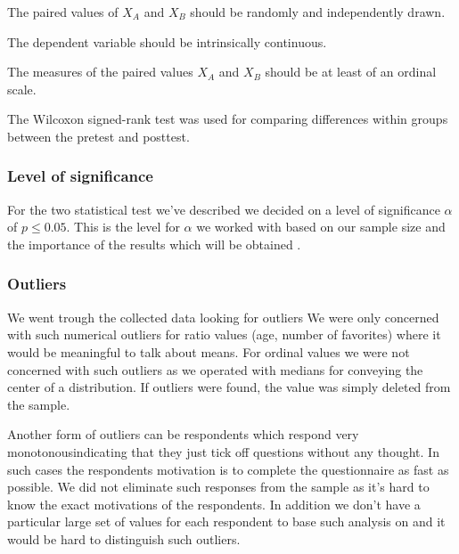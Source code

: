 \begin{enum}
  \item The paired values of $X_A$ and $X_B$
    should be randomly and independently drawn.
  \item The dependent variable should be intrinsically continuous.
  \item The measures of the paired values $X_A$ and $X_B$
    should be at least of an ordinal scale.
\end{enum}

The Wilcoxon signed-rank test was used for comparing differences within
groups between the pretest and posttest.

\subsubsection{Level of significance}
\label{section:empirical.method.data.analysis.level.of.significance}

For the two statistical test we've described we decided on a level
of significance $\alpha$ of $p \leq 0.05$.
This is the level for $\alpha$ we worked with based on
our sample size and the importance of the results which will be obtained
\citep[]{siegel88}.

\subsubsection{Outliers}

We went trough the collected data looking for outliers
\dash{}
We were only concerned with such numerical outliers for ratio values
(age, number of favorites) where it would be meaningful to talk about means.
For ordinal values we were not concerned with such outliers as we operated
with medians for conveying the center of a distribution.
If outliers were found, the value was simply deleted from the sample.

Another form of outliers can be respondents which respond very
monotonous\dash{}indicating that they just tick off questions without any
thought. In such cases the respondents motivation is to complete the
questionnaire as fast as possible. We did not eliminate such responses from
the sample as it's hard to know the exact motivations of the respondents.
In addition we don't have a particular large set of values for each respondent
to base such analysis on and it would be hard to distinguish such outliers.
